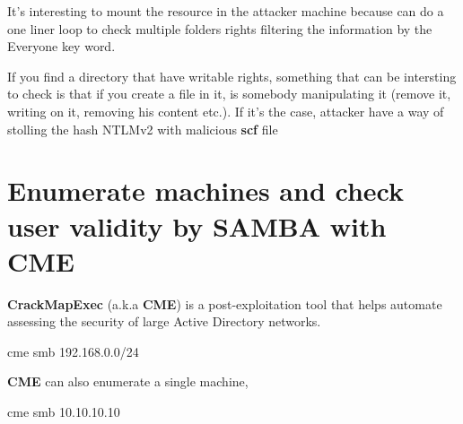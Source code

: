 \documentclass{assets/ipesethesis}
\newenvironment{Shaded}{\begin{snugshade}}{\end{snugshade}}
\newcommand{\BuiltInTok}[1]{#1}
\newcommand{\ExtensionTok}[1]{#1}
\newcommand{\FunctionTok}[1]{\textcolor[rgb]{0.00,0.00,0.00}{#1}}
\newcommand{\KeywordTok}[1]{\textcolor[rgb]{0.13,0.29,0.53}{\textbf{#1}}}
\newcommand{\NormalTok}[1]{#1}
\newcommand{\OperatorTok}[1]{\textcolor[rgb]{0.81,0.36,0.00}{\textbf{#1}}}
\newcommand{\StringTok}[1]{\textcolor[rgb]{0.31,0.60,0.02}{#1}}
\newcommand{\VariableTok}[1]{\textcolor[rgb]{0.00,0.00,0.00}{#1}}
\begin{document}
It's interesting to mount the resource in the attacker machine because can do a one liner loop to check multiple folders rights filtering the information
by the Everyone key word.

\begin{Shaded}
\end{Shaded}

If you find a directory that have writable rights, something that can be intersting to check is that if you create a file in it, is somebody
manipulating it (remove it, writing on it, removing his content etc.). If it's the case, attacker have a way of stolling the hash NTLMv2 with
malicious \textbf{scf} file

\hypertarget{enumerate-machines-and-check-user-validity-by-samba-with-cme}{%
\section*{Enumerate machines and check user validity by SAMBA with CME}\label{enumerate-machines-and-check-user-validity-by-samba-with-cme}}

\textbf{CrackMapExec} (a.k.a \textbf{CME}) is a post-exploitation tool that helps automate assessing the security of large Active Directory networks.

\begin{Shaded}
\begin{Highlighting}[]
\ExtensionTok{cme}\NormalTok{ smb 192.168.0.0/24}
\end{Highlighting}
\end{Shaded}

\textbf{CME} can also enumerate a single machine,

\begin{Shaded}
\begin{Highlighting}[]
\ExtensionTok{cme}\NormalTok{ smb 10.10.10.10}
\end{Highlighting}
\end{Shaded}
\end{document}
